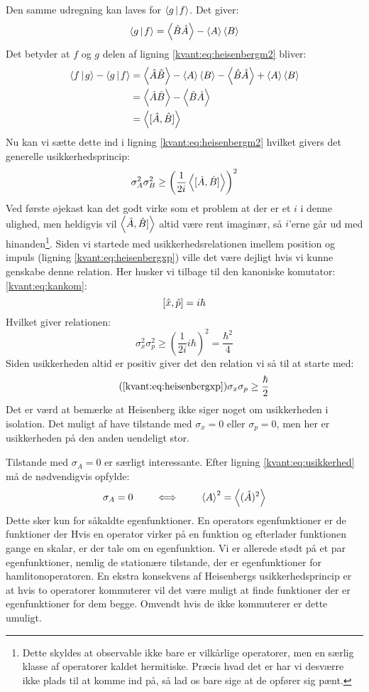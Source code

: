\documentclass[../Kvantemekanik.tex]{subfiles}
\begin{document}
Den samme udregning kan laves for $\braket{g}{f}$. Det giver:
$$
\braket{g}{f} = \expect{\op B\op A}-\expect A \expect B
$$
Det betyder at $f$ og $g$ delen af ligning \eqref{kvant:eq:heisenbergm2} bliver:
\begin{align*}
\braket{f}{g}-\braket{g}{f} &= \expect{\op A \op B}-\expect A\expect B-\expect{\op B \op A} + \expect A \expect B\\
&= \expect{\op A \op B}-\expect{\op B \op A}\\
&= \expect{[\op A,\op B]}
\end{align*}
Nu kan vi sætte dette ind i ligning \eqref{kvant:eq:heisenbergm2} hvilket givers det generelle usikkerhedsprincip:
\begin{equation}
    \sigma_A^2\sigma_B^2\geq \left(\frac{1}{2i}\left< [\hat A,\hat B] \right>\right)^2
    \label{kvant:eq:heisenberg}
\end{equation}
Ved første øjekast kan det godt virke som et problem at der er et $i$ i denne ulighed, men heldigvis vil $\left< \hat A,\hat B] \right>$ altid være rent imaginær, så $i$'erne går ud med hinanden\footnote{
Dette skyldes at observable ikke bare er vilkårlige operatorer, men en særlig klasse af operatorer kaldet hermitiske. Præcis hvad det er har vi desværre ikke plads til at komme ind på, så lad os bare sige at de opfører sig pænt.}.
Siden vi startede med usikkerhedsrelationen imellem position og impuls (ligning \eqref{kvant:eq:heisenbergxp}) ville det være dejligt hvis vi kunne genskabe denne relation. Her husker vi tilbage til den kanoniske komutator: \eqref{kvant:eq:kankom}:
$$
[\hat x,\hat p] = i\hbar
$$
Hvilket giver relationen:
$$
\sigma_x^2\sigma_p^2 \geq \left( \frac{1}{2i}i\hbar \right)^2 = \frac{\hbar^2}{4}
$$
Siden usikkerheden altid er positiv giver det den relation vi så til at starte med:
\begin{equation}\tag{\ref{kvant:eq:heisenbergxp}}
\sigma_x\sigma_p \geq \frac{\hbar}{2}
\end{equation}
Det er værd at bemærke at Heisenberg ikke siger noget om usikkerheden i isolation. Det muligt af have tilstande med $\sigma_x =0$ eller $\sigma_p=0$, men her er usikkerheden på den anden uendeligt stor.

Tilstande med $\sigma_A=0$ er særligt interessante. Efter ligning \eqref{kvant:eq:usikkerhed} må de nødvendigvis opfylde:
\begin{equation}
    \sigma_A=0 ~~~~~~\iff ~~~~~~\left< A \right>^2=\left< (\hat A)^2 \right>
\end{equation}
Dette sker kun for såkaldte egenfunktioner. En operators egenfunktioner er de funktioner der  Hvis en operator virker på en funktion og efterlader funktionen gange en skalar, er der tale om en egenfunktion. Vi er allerede stødt på et par egenfunktioner, nemlig de stationære tilstande, der er egenfunktioner for hamlitonoperatoren. En ekstra konsekvens af Heisenbergs usikkerhedsprincip er at hvis to operatorer kommuterer vil det være muligt at finde funktioner der er egenfunktioner for dem begge. Omvendt hvis de ikke kommuterer er dette umuligt.
\end{document}
